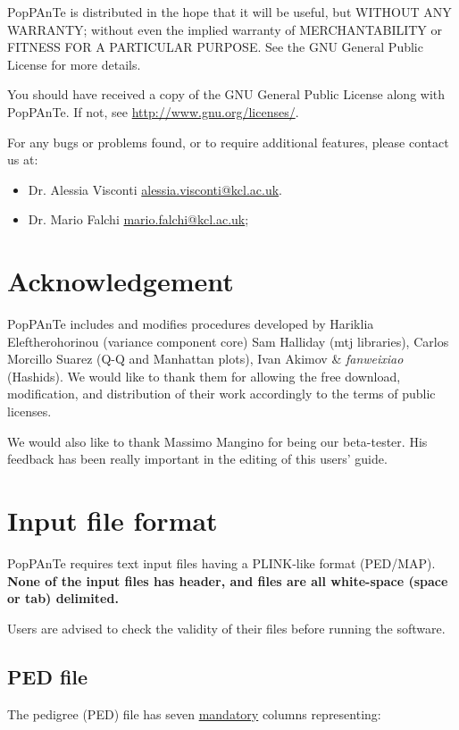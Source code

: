 \documentclass[a4paper,9pt]{article}
\newcommand{\minusitem}{\item[-]}
\begin{document}
\noindent
PopPAnTe is distributed in the hope that it will be useful, but WITHOUT ANY WARRANTY; without even the implied warranty of MERCHANTABILITY or FITNESS FOR A PARTICULAR PURPOSE.  See the GNU General Public License for more details.

\noindent
You should have received a copy of the GNU General Public License along with PopPAnTe.  If not, see \url{http://www.gnu.org/licenses/}.

\vspace{0.3cm}

\noindent
For any bugs or problems found, or to require additional features, please contact us at:
\begin{itemize}
	\setlength{\itemsep}{-5pt}
	\minusitem Dr. Alessia Visconti \url{alessia.visconti@kcl.ac.uk}.
	\minusitem Dr. Mario Falchi \url{mario.falchi@kcl.ac.uk};
\end{itemize}


\section{Acknowledgement}

\noindent
PopPAnTe includes and modifies procedures developed by Hariklia Eleftherohorinou (variance component core) Sam Halliday (mtj libraries), Carlos Morcillo Suarez (Q-Q and Manhattan plots), Ivan Akimov \& \emph{fanweixiao} (Hashids). We would like to thank them for allowing the free download, modification, and distribution of their work accordingly to the terms of public licenses.

\noindent
We would also like to thank Massimo Mangino for being our beta-tester. His feedback has been really important in the editing of this users' guide.

\newpage

\section{Input file format}

PopPAnTe requires text input files having a PLINK-like format (PED/MAP). \textbf{None of the input files has header, and files are all white-space (space or tab) delimited. }

\noindent
Users are advised to check the validity of their files before running the software.

\subsection{PED file}
\label{sec:pedfile}
The pedigree (PED) file has seven \underline{mandatory} columns representing: 
\end{document}
